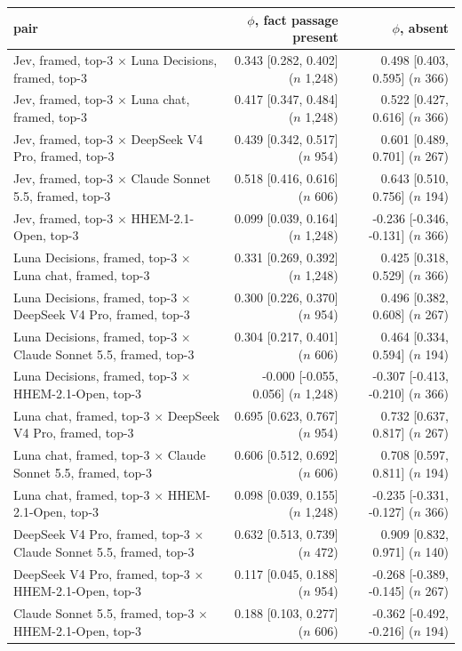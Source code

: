 \begin{tabular}{lrr}
\toprule
pair & $\phi$, fact passage present & $\phi$, absent \\
\midrule
Jev, framed, top-3 $\times$ Luna Decisions, framed, top-3 & 0.343 [0.282, 0.402] ($n$ 1,248) & 0.498 [0.403, 0.595] ($n$ 366) \\
Jev, framed, top-3 $\times$ Luna chat, framed, top-3 & 0.417 [0.347, 0.484] ($n$ 1,248) & 0.522 [0.427, 0.616] ($n$ 366) \\
Jev, framed, top-3 $\times$ DeepSeek V4 Pro, framed, top-3 & 0.439 [0.342, 0.517] ($n$ 954) & 0.601 [0.489, 0.701] ($n$ 267) \\
Jev, framed, top-3 $\times$ Claude Sonnet 5.5, framed, top-3 & 0.518 [0.416, 0.616] ($n$ 606) & 0.643 [0.510, 0.756] ($n$ 194) \\
Jev, framed, top-3 $\times$ HHEM-2.1-Open, top-3 & 0.099 [0.039, 0.164] ($n$ 1,248) & -0.236 [-0.346, -0.131] ($n$ 366) \\
Luna Decisions, framed, top-3 $\times$ Luna chat, framed, top-3 & 0.331 [0.269, 0.392] ($n$ 1,248) & 0.425 [0.318, 0.529] ($n$ 366) \\
Luna Decisions, framed, top-3 $\times$ DeepSeek V4 Pro, framed, top-3 & 0.300 [0.226, 0.370] ($n$ 954) & 0.496 [0.382, 0.608] ($n$ 267) \\
Luna Decisions, framed, top-3 $\times$ Claude Sonnet 5.5, framed, top-3 & 0.304 [0.217, 0.401] ($n$ 606) & 0.464 [0.334, 0.594] ($n$ 194) \\
Luna Decisions, framed, top-3 $\times$ HHEM-2.1-Open, top-3 & -0.000 [-0.055, 0.056] ($n$ 1,248) & -0.307 [-0.413, -0.210] ($n$ 366) \\
Luna chat, framed, top-3 $\times$ DeepSeek V4 Pro, framed, top-3 & 0.695 [0.623, 0.767] ($n$ 954) & 0.732 [0.637, 0.817] ($n$ 267) \\
Luna chat, framed, top-3 $\times$ Claude Sonnet 5.5, framed, top-3 & 0.606 [0.512, 0.692] ($n$ 606) & 0.708 [0.597, 0.811] ($n$ 194) \\
Luna chat, framed, top-3 $\times$ HHEM-2.1-Open, top-3 & 0.098 [0.039, 0.155] ($n$ 1,248) & -0.235 [-0.331, -0.127] ($n$ 366) \\
DeepSeek V4 Pro, framed, top-3 $\times$ Claude Sonnet 5.5, framed, top-3 & 0.632 [0.513, 0.739] ($n$ 472) & 0.909 [0.832, 0.971] ($n$ 140) \\
DeepSeek V4 Pro, framed, top-3 $\times$ HHEM-2.1-Open, top-3 & 0.117 [0.045, 0.188] ($n$ 954) & -0.268 [-0.389, -0.145] ($n$ 267) \\
Claude Sonnet 5.5, framed, top-3 $\times$ HHEM-2.1-Open, top-3 & 0.188 [0.103, 0.277] ($n$ 606) & -0.362 [-0.492, -0.216] ($n$ 194) \\
\bottomrule
\end{tabular}
